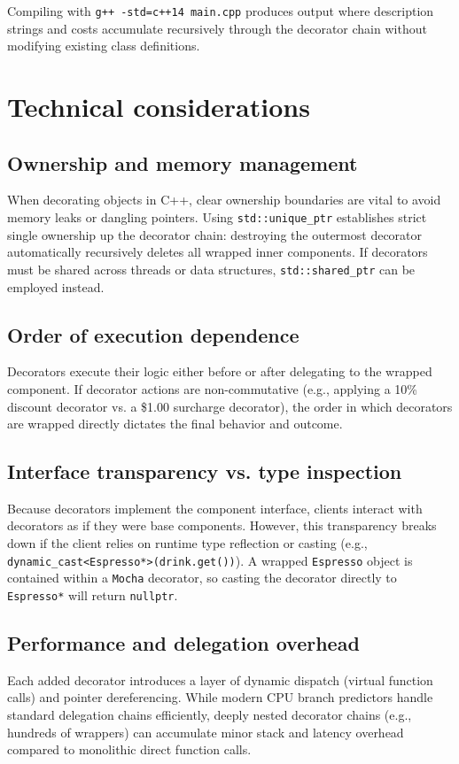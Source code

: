 \documentclass[11pt,a4paper]{report}
\begin{document}
Compiling with \texttt{g++ -std=c++14 main.cpp} produces output where description strings and costs accumulate recursively through the decorator chain without modifying existing class definitions.

\section{Technical considerations}
\subsection{Ownership and memory management}
When decorating objects in C++, clear ownership boundaries are vital to avoid memory leaks or dangling pointers. Using \texttt{std::unique\_ptr} establishes strict single ownership up the decorator chain: destroying the outermost decorator automatically recursively deletes all wrapped inner components. If decorators must be shared across threads or data structures, \texttt{std::shared\_ptr} can be employed instead.

\subsection{Order of execution dependence}
Decorators execute their logic either before or after delegating to the wrapped component. If decorator actions are non-commutative (e.g., applying a 10\% discount decorator vs. a \$1.00 surcharge decorator), the order in which decorators are wrapped directly dictates the final behavior and outcome.

\subsection{Interface transparency vs. type inspection}
Because decorators implement the component interface, clients interact with decorators as if they were base components. However, this transparency breaks down if the client relies on runtime type reflection or casting (e.g., \texttt{dynamic\_cast<Espresso*>(drink.get())}). A wrapped \texttt{Espresso} object is contained within a \texttt{Mocha} decorator, so casting the decorator directly to \texttt{Espresso*} will return \texttt{nullptr}.

\subsection{Performance and delegation overhead}
Each added decorator introduces a layer of dynamic dispatch (virtual function calls) and pointer dereferencing. While modern CPU branch predictors handle standard delegation chains efficiently, deeply nested decorator chains (e.g., hundreds of wrappers) can accumulate minor stack and latency overhead compared to monolithic direct function calls.
\end{document}
